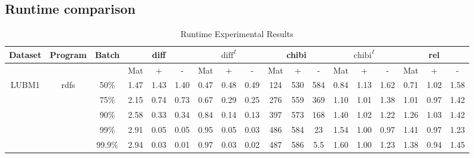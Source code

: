 \documentclass[sigconf,screen,review,natbib]{acmart}
\theoremstyle{definition}
\begin{document}
\subsection{Runtime comparison}
\begin{table*}
	\caption{Runtime Experimental Results}
	\begin{center}
		\begin{tabular}{|c|c|c|c|c|c|c|c|c|c|c|c|c|c|c|c|c|c|}
			\hline
			Dataset & Program                 & Batch  & \multicolumn{3}{c|}{diff} & \multicolumn{3}{c|}{$\text{diff}^{I}$} & \multicolumn{3}{c|}{chibi} & \multicolumn{3}{c|}{$\text{chibi}^{I}$} & \multicolumn{3}{c|}{rel}                                                                       \\
			\hline
			        &                         &        & Mat                       & +                                      & -                          & Mat                                     & +                        & -    & Mat  & +    & -    & Mat  & +    & -    & Mat  & +    & -    \\
			\hline
			LUBM1   & \multirow{6}{*}{rdfs}   & 50\%   & 1.47                      & 1.43                                   & 1.40                       & 0.47                                    & 0.48                     & 0.49 & 124  & 530  & 584  & 0.84 & 1.13 & 1.62 & 0.71 & 1.02 & 1.58 \\
			        &                         & 75\%   & 2.15                      & 0.74                                   & 0.73                       & 0.67                                    & 0.29                     & 0.25 & 276  & 559  & 369  & 1.10 & 1.01 & 1.38 & 1.01 & 0.97 & 1.42 \\
			        &                         & 90\%   & 2.58                      & 0.33                                   & 0.34                       & 0.84                                    & 0.14                     & 0.13 & 397  & 573  & 168  & 1.40 & 1.02 & 1.22 & 1.26 & 1.03 & 1.42 \\
			        &                         & 99\%   & 2.91                      & 0.05                                   & 0.05                       & 0.95                                    & 0.05                     & 0.03 & 486  & 584  & 23   & 1.54 & 1.00 & 0.97 & 1.41 & 0.97 & 1.23 \\
			        &                         & 99.9\% & 2.94                      & 0.03                                   & 0.01                       & 0.97                                    & 0.03                     & 0.02 & 487  & 586  & 5.5  & 1.60 & 1.00 & 1.23 & 1.38 & 0.94 & 1.45 \\

\end{tabular}
\end{center}
\end{table*}
\end{document}
